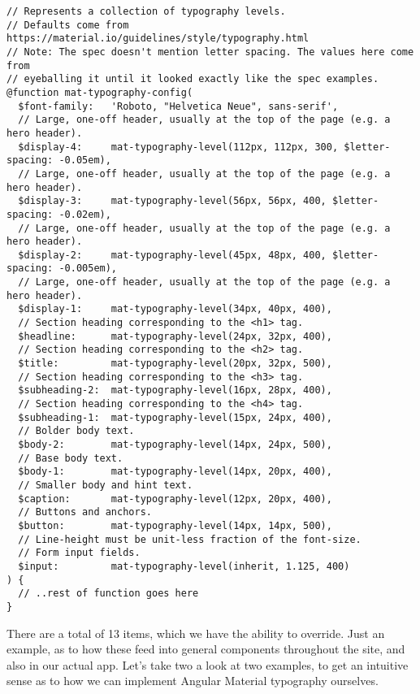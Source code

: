 \begin{lstlisting}[caption=@angular/material/\_theming.scss]
// Represents a collection of typography levels.
// Defaults come from https://material.io/guidelines/style/typography.html
// Note: The spec doesn't mention letter spacing. The values here come from
// eyeballing it until it looked exactly like the spec examples.
@function mat-typography-config(
  $font-family:   'Roboto, "Helvetica Neue", sans-serif',
  // Large, one-off header, usually at the top of the page (e.g. a hero header).
  $display-4:     mat-typography-level(112px, 112px, 300, $letter-spacing: -0.05em),
  // Large, one-off header, usually at the top of the page (e.g. a hero header).
  $display-3:     mat-typography-level(56px, 56px, 400, $letter-spacing: -0.02em),
  // Large, one-off header, usually at the top of the page (e.g. a hero header).
  $display-2:     mat-typography-level(45px, 48px, 400, $letter-spacing: -0.005em),
  // Large, one-off header, usually at the top of the page (e.g. a hero header).
  $display-1:     mat-typography-level(34px, 40px, 400),
  // Section heading corresponding to the <h1> tag.
  $headline:      mat-typography-level(24px, 32px, 400),
  // Section heading corresponding to the <h2> tag.
  $title:         mat-typography-level(20px, 32px, 500),
  // Section heading corresponding to the <h3> tag.
  $subheading-2:  mat-typography-level(16px, 28px, 400),
  // Section heading corresponding to the <h4> tag.
  $subheading-1:  mat-typography-level(15px, 24px, 400),
  // Bolder body text.
  $body-2:        mat-typography-level(14px, 24px, 500),
  // Base body text.
  $body-1:        mat-typography-level(14px, 20px, 400),
  // Smaller body and hint text.
  $caption:       mat-typography-level(12px, 20px, 400),
  // Buttons and anchors.
  $button:        mat-typography-level(14px, 14px, 500),
  // Line-height must be unit-less fraction of the font-size.
  // Form input fields.
  $input:         mat-typography-level(inherit, 1.125, 400)
) {
  // ..rest of function goes here
}  
\end{lstlisting}

There are a total of 13 items, which we have the ability to override. Just an 
example, as to how these feed into general components throughout the site, and 
also in our actual app. Let's take two a look at two examples, to get an intuitive 
sense as to how we can implement Angular Material typography ourselves. 

